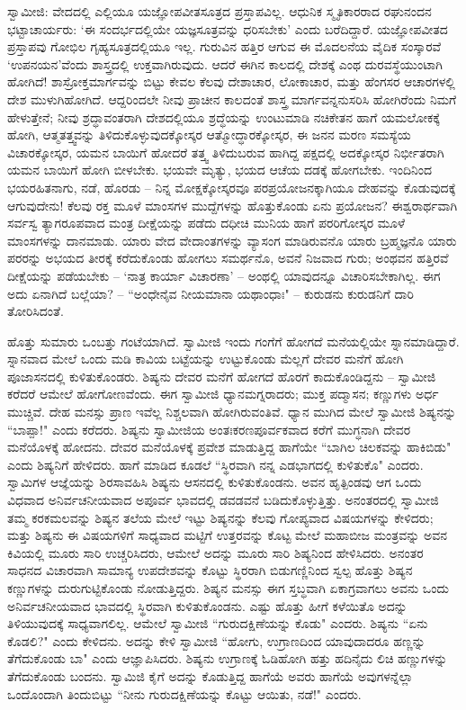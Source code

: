 ಸ್ವಾಮೀಜಿ: ವೇದದಲ್ಲಿ ಎಲ್ಲಿಯೂ ಯಜ್ಞೋಪವೀತಸೂತ್ರದ ಪ್ರಸ್ತಾಪವಿಲ್ಲ. ಆಧುನಿಕ ಸ್ಮೃತಿಕಾರರಾದ ರಘುನಂದನ ಭಟ್ಟಾಚಾರ್ಯರು: ‘ಈ ಸಂದರ್ಭದಲ್ಲಿಯೇ ಯಜ್ಞಸೂತ್ರವನ್ನು ಧರಿಸಬೇಕು’ ಎಂದು ಬರೆದಿದ್ದಾರೆ. ಯಜ್ಞೋಪವೀತದ ಪ್ರಸ್ತಾಪವು ಗೋಭಿಲ ಗೃಹ್ಯಸೂತ್ರದಲ್ಲಿಯೂ ಇಲ್ಲ. ಗುರುವಿನ ಹತ್ತಿರ ಆಗುವ ಈ ಮೊದಲನೆಯ ವೈದಿಕ ಸಂಸ್ಕಾರವೆ ‘ಉಪನಯನ’ವೆಂದು ಶಾಸ್ತ್ರದಲ್ಲಿ ಉಕ್ತವಾಗಿರುವುದು. ಆದರೆ ಈಗಿನ ಕಾಲದಲ್ಲಿ ದೇಶಕ್ಕೆ ಎಂಥ ದುರವಸ್ಥೆಯುಂಟಾಗಿ ಹೋಗಿದೆ! ಶಾಸ್ರೋಕ್ತಮಾರ್ಗವನ್ನು ಬಿಟ್ಟು ಕೇವಲ ಕೆಲವು ದೇಶಾಚಾರ, ಲೋಕಾಚಾರ, ಮತ್ತು ಹೆಂಗಸರ ಆಚಾರಗಳಲ್ಲಿ ದೇಶ ಮುಳುಗಿಹೋಗಿದೆ. ಆದ್ದರಿಂದಲೇ ನೀವು ಪ್ರಾಚೀನ ಕಾಲದಂತೆ ಶಾಸ್ತ್ರ ಮಾರ್ಗವನ್ನನುಸರಿಸಿ ಹೋಗಿರೆಂದು ನಿಮಗೆ ಹೇಳುತ್ತೇನೆ; ನೀವು ಶ್ರದ್ಧಾವಂತರಾಗಿ ದೇಶದಲ್ಲಿಯೂ ಶ್ರದ್ಧೆಯನ್ನು ಉಂಟುಮಾಡಿ ನಚಿಕೇತನ ಹಾಗೆ ಯಮಲೋಕಕ್ಕೆ ಹೋಗಿ, ಆತ್ಮತತ್ತ್ವವನ್ನು ತಿಳಿದುಕೊಳ್ಳುವುದಕ್ಕೋಸ್ಕರ ಆತ್ಮೋದ್ಧಾರಕ್ಕೋಸ್ಕರ, ಈ ಜನನ ಮರಣ ಸಮಸ್ಯೆಯ ವಿಚಾರಕ್ಕೋಸ್ಕರ, ಯಮನ ಬಾಯಿಗೆ ಹೋದರೆ ತತ್ತ್ವ ತಿಳಿದುಬರುವ ಹಾಗಿದ್ದ ಪಕ್ಷದಲ್ಲಿ ಅದಕ್ಕೋಸ್ಕರ ನಿರ್ಭೀತರಾಗಿ ಯಮನ ಬಾಯಿಗೆ ಹೋಗಿ ಬೀಳಬೇಕು. ಭಯವೇ ಮೃತ್ಯು, ಭಯದ ಆಚೆಯ ದಡಕ್ಕೆ ಹೋಗಬೇಕು. ಇಂದಿನಿಂದ ಭಯರಹಿತನಾಗು, ನಡೆ, ಹೊರಡು – ನಿನ್ನ ಮೋಕ್ಷಕ್ಕೋಸ್ಕರವೂ ಪರಪ್ರಯೋಜನಕ್ಕಾಗಿಯೂ ದೇಹವನ್ನು ಕೊಡುವುದಕ್ಕೆ ಆಗುವುದೇನು! ಕೆಲವು ರಕ್ತ ಮೂಳೆ ಮಾಂಸಗಳ ಮುದ್ದೆಗಳನ್ನು ಹೊತ್ತುಕೊಂಡು ಏನು ಪ್ರಯೋಜನ? ಈಶ್ವರಾರ್ಥವಾಗಿ ಸರ್ವಸ್ವ ತ್ಯಾಗರೂಪವಾದ ಮಂತ್ರ ದೀಕ್ಷೆಯನ್ನು ಪಡೆದು ದಧೀಚಿ ಮುನಿಯ ಹಾಗೆ ಪರರಿಗೋಸ್ಕರ ಮೂಳೆ ಮಾಂಸಗಳನ್ನು ದಾನಮಾಡು. ಯಾರು ವೇದ ವೇದಾಂತಗಳನ್ನು ವ್ಯಾಸಂಗ ಮಾಡಿರುವನೊ ಯಾರು ಬ್ರಹ್ಮಜ್ಞನೊ ಯಾರು ಪರರನ್ನು ಅಭಯದ ತೀರಕ್ಕೆ ಕರೆದುಕೊಂಡು ಹೋಗಲು ಸಮರ್ಥನೊ, ಅವನೆ ನಿಜವಾದ ಗುರು; ಅಂಥವನ ಹತ್ತಿರವೆ ದೀಕ್ಷೆಯನ್ನು ಪಡೆಯಬೇಕು – ‘ನಾತ್ರ ಕಾರ್ಯಾ ವಿಚಾರಣಾ’ – ಅಂಥಲ್ಲಿ ಯಾವುದನ್ನೂ ವಿಚಾರಿಸಬೇಕಾಗಿಲ್ಲ. ಈಗ ಅದು ಏನಾಗಿದೆ ಬಲ್ಲೆಯಾ? – “ಅಂಧೇನೈವ ನೀಯಮಾನಾ ಯಥಾಂಧಾಃ" – ಕುರುಡನು ಕುರುಡನಿಗೆ ದಾರಿ ತೋರಿಸಿದಂತೆ.

ಹೊತ್ತು ಸುಮಾರು ಒಂಬತ್ತು ಗಂಟೆಯಾಗಿದೆ. ಸ್ವಾಮೀಜಿ ಇಂದು ಗಂಗೆಗೆ ಹೋಗದೆ ಮನೆಯಲ್ಲಿಯೇ ಸ್ನಾನಮಾಡಿದ್ದಾರೆ. ಸ್ನಾನವಾದ ಮೇಲೆ ಒಂದು ಮಡಿ ಕಾವಿಯ ಬಟ್ಟೆಯನ್ನು ಉಟ್ಟುಕೊಂಡು ಮೆಲ್ಲಗೆ ದೇವರ ಮನೆಗೆ ಹೋಗಿ ಪೂಜಾಸನದಲ್ಲಿ ಕುಳಿತುಕೊಂಡರು. ಶಿಷ್ಯನು ದೇವರ ಮನೆಗೆ ಹೋಗದೆ ಹೊರಗೆ ಕಾದುಕೊಂಡಿದ್ದನು – ಸ್ವಾಮೀಜಿ ಕರೆದರೆ ಆಮೇಲೆ ಹೋಗೋಣವೆಂದು. ಈಗ ಸ್ವಾಮೀಜಿ ಧ್ಯಾನಮಗ್ನರಾದರು; ಮುಕ್ತ ಪದ್ಮಾಸನ; ಕಣ್ಣುಗಳು ಅರ್ಧ ಮುಚ್ಚಿವೆ. ದೇಹ ಮನಸ್ಸು ಪ್ರಾಣ ಇವೆಲ್ಲ ನಿಶ್ಚಲವಾಗಿ ಹೋಗಿರುವಂತಿವೆ. ಧ್ಯಾನ ಮುಗಿದ ಮೇಲೆ ಸ್ವಾಮೀಜಿ ಶಿಷ್ಯನನ್ನು “ಬಾಪ್ಪಾ!" ಎಂದು ಕರೆದರು. ಶಿಷ್ಯನು ಸ್ವಾಮೀಜಿಯ ಅಂತಃಕರಣಪೂರ್ವಕವಾದ ಕರೆಗೆ ಮುಗ್ಧನಾಗಿ ದೇವರ ಮನೆಯೊಳಕ್ಕೆ ಹೋದನು. ದೇವರ ಮನೆಯೊಳಕ್ಕೆ ಪ್ರವೇಶ ಮಾಡುತ್ತಿದ್ದ ಹಾಗೆಯೇ “ಬಾಗಿಲ ಚಿಲಕವನ್ನು ಹಾಕಿಬಿಡು" ಎಂದು ಶಿಷ್ಯನಿಗೆ ಹೇಳಿದರು. ಹಾಗೆ ಮಾಡಿದ ಕೂಡಲೆ “ಸ್ಥಿರವಾಗಿ ನನ್ನ ಎಡಭಾಗದಲ್ಲಿ ಕುಳಿತುಕೊ" ಎಂದರು. ಸ್ವಾಮಿಗಳ ಆಜ್ಞೆಯನ್ನು ಶಿರಸಾವಹಿಸಿ ಶಿಷ್ಯನು ಆಸನದಲ್ಲಿ ಕುಳಿತುಕೊಂಡನು. ಅವನ ಹೃತ್ಪಿಂಡವು ಆಗ ಒಂದು ವಿಧವಾದ ಅನಿರ್ವಚನೀಯವಾದ ಅಪೂರ್ವ ಭಾವದಲ್ಲಿ ಡವಡವನೆ ಬಡಿದುಕೊಳ್ಳುತ್ತಿತ್ತು. ಅನಂತರದಲ್ಲಿ ಸ್ವಾಮೀಜಿ ತಮ್ಮ ಕರಕಮಲವನ್ನು ಶಿಷ್ಯನ ತಲೆಯ ಮೇಲೆ ಇಟ್ಟು ಶಿಷ್ಯನನ್ನು ಕೆಲವು ಗೋಪ್ಯವಾದ ವಿಷಯಗಳನ್ನು ಕೇಳಿದರು; ಮತ್ತು ಶಿಷ್ಯನು ಈ ವಿಷಯಗಳಿಗೆ ಸಾಧ್ಯವಾದ ಮಟ್ಟಿಗೆ ಉತ್ತರವನ್ನು ಕೊಟ್ಟ ಮೇಲೆ ಮಹಾಬೀಜ ಮಂತ್ರವನ್ನು ಅವನ ಕಿವಿಯಲ್ಲಿ ಮೂರು ಸಾರಿ ಉಚ್ಚರಿಸಿದರು, ಆಮೇಲೆ ಅದನ್ನು ಮೂರು ಸಾರಿ ಶಿಷ್ಯನಿಂದ ಹೇಳಿಸಿದರು. ಅನಂತರ ಸಾಧನದ ವಿಚಾರವಾಗಿ ಸಾಮಾನ್ಯ ಉಪದೇಶವನ್ನು ಕೊಟ್ಟು ಸ್ಥಿರರಾಗಿ ಬಿಡುಗಣ್ಣಿನಿಂದ ಸ್ವಲ್ಪ ಹೊತ್ತು ಶಿಷ್ಯನ ಕಣ್ಣುಗಳನ್ನು ದುರುಗುಟ್ಟಿಕೊಂಡು ನೋಡುತ್ತಿದ್ದರು. ಶಿಷ್ಯನ ಮನಸ್ಸು ಈಗ ಸ್ತಬ್ಧವಾಗಿ ಏಕಾಗ್ರವಾಗಲು ಅವನು ಒಂದು ಅನಿರ್ವಚನೀಯವಾದ ಭಾವದಲ್ಲಿ ಸ್ಥಿರವಾಗಿ ಕುಳಿತುಕೊಂಡನು. ಎಷ್ಟು ಹೊತ್ತು ಹೀಗೆ ಕಳೆಯಿತೊ ಅದನ್ನು ತಿಳಿಯುವುದಕ್ಕೆ ಸಾಧ್ಯವಾಗಲಿಲ್ಲ. ಆಮೇಲೆ ಸ್ವಾಮೀಜಿ “ಗುರುದಕ್ಷಿಣೆಯನ್ನು ಕೊಡು" ಎಂದರು. ಶಿಷ್ಯನು “ಏನು ಕೊಡಲಿ?" ಎಂದು ಕೇಳಿದನು. ಅದನ್ನು ಕೇಳಿ ಸ್ವಾಮೀಜಿ “ಹೋಗು, ಉಗ್ರಾಣದಿಂದ ಯಾವುದಾದರೂ ಹಣ್ಣನ್ನು ತೆಗೆದುಕೊಂಡು ಬಾ" ಎಂದು ಆಜ್ಞಾಪಿಸಿದರು. ಶಿಷ್ಯನು ಉಗ್ರಾಣಕ್ಕೆ ಓಡಿಹೋಗಿ ಹತ್ತು ಹದಿನೈದು ಲಿಚಿ ಹಣ್ಣುಗಳನ್ನು ತೆಗೆದುಕೊಂಡು ಬಂದನು. ಸ್ವಾಮಿಜಿ ಕೈಗೆ ಅದನ್ನು ಕೊಡುತ್ತಿದ್ದ ಹಾಗೆಯೆ ಅವರು ಹಾಗೆಯೆ ಅವುಗಳನ್ನೆಲ್ಲಾ ಒಂದೊಂದಾಗಿ ತಿಂದುಬಿಟ್ಟು “ನೀನು ಗುರುದಕ್ಷಿಣೆಯನ್ನು ಕೊಟ್ಟು ಆಯಿತು, ನಡೆ!" ಎಂದರು.

